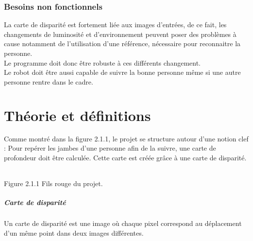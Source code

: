 \documentclass[12pt,a4paper]{report}
\begin{document}
\subsection{Besoins non fonctionnels}
	La carte de disparité est fortement liée aux images d'entrées, de ce fait, les changements de luminosité et d'environnement peuvent poser des problèmes à cause notamment de l'utilisation d'une référence, nécessaire pour reconnaitre la personne.\\
	Le programme doit donc être robuste à ces différents changement.\\
	Le robot doit être aussi capable de suivre la bonne personne même si une autre personne rentre dans le cadre.
	
\chapter{Théorie et définitions}

Comme montré dans la figure 2.1.1, le projet se structure autour d'une notion clef : Pour repérer les jambes d'une personne afin de la suivre, une carte de profondeur doit être calculée. Cette carte est créée grâce à une carte de disparité. 

\begin{center}
\\
Figure 2.1.1 Fils rouge du projet.
\end{center}

\paragraph{Carte de disparité}
Un carte de disparité est une image où chaque pixel correspond au déplacement d'un même point dans deux images différentes. 
\end{document}
